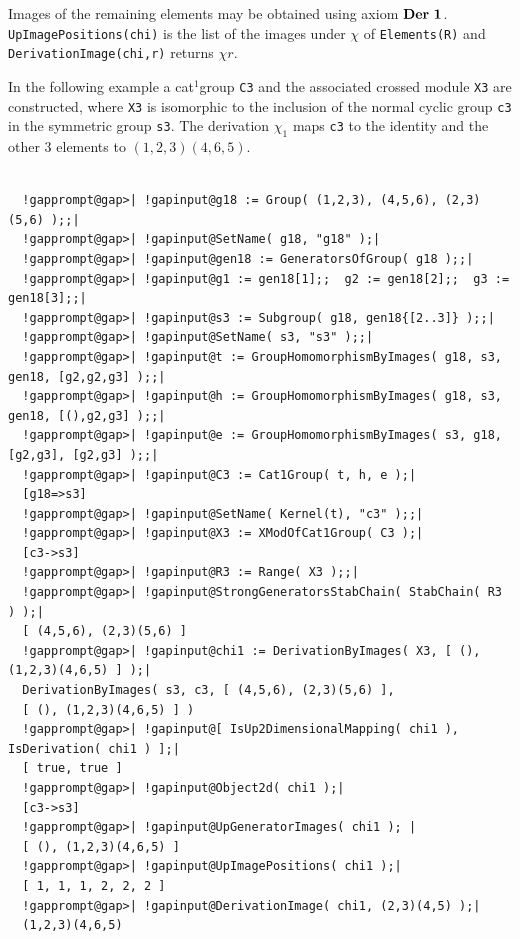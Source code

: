\documentclass[a4paper,11pt]{report}
\begin{document}
{{{ Images of the remaining elements may be obtained using axiom ${\bf Der\ 1}$. \texttt{UpImagePositions(chi)} is the list of the images under $\chi$ of \texttt{Elements(R)} and \texttt{DerivationImage(chi,r)} returns $\chi r$. 

 In the following example a cat$^1$\texttt{}group \texttt{C3} and the associated crossed module \texttt{X3} are constructed, where \texttt{X3} is isomorphic to the inclusion of the normal cyclic group \texttt{c3} in the symmetric group \texttt{s3}. The derivation $\chi_1$ maps \texttt{c3} to the identity and the other $3$ elements to $(1,2,3)(4,6,5)$. }

 

 
\begin{Verbatim}[commandchars=!@|,fontsize=\small,frame=single,label=Example]
  
  !gapprompt@gap>| !gapinput@g18 := Group( (1,2,3), (4,5,6), (2,3)(5,6) );;|
  !gapprompt@gap>| !gapinput@SetName( g18, "g18" );|
  !gapprompt@gap>| !gapinput@gen18 := GeneratorsOfGroup( g18 );;|
  !gapprompt@gap>| !gapinput@g1 := gen18[1];;  g2 := gen18[2];;  g3 := gen18[3];;|
  !gapprompt@gap>| !gapinput@s3 := Subgroup( g18, gen18{[2..3]} );;|
  !gapprompt@gap>| !gapinput@SetName( s3, "s3" );;|
  !gapprompt@gap>| !gapinput@t := GroupHomomorphismByImages( g18, s3, gen18, [g2,g2,g3] );;|
  !gapprompt@gap>| !gapinput@h := GroupHomomorphismByImages( g18, s3, gen18, [(),g2,g3] );;|
  !gapprompt@gap>| !gapinput@e := GroupHomomorphismByImages( s3, g18, [g2,g3], [g2,g3] );;|
  !gapprompt@gap>| !gapinput@C3 := Cat1Group( t, h, e );|
  [g18=>s3]
  !gapprompt@gap>| !gapinput@SetName( Kernel(t), "c3" );;|
  !gapprompt@gap>| !gapinput@X3 := XModOfCat1Group( C3 );|
  [c3->s3]
  !gapprompt@gap>| !gapinput@R3 := Range( X3 );;|
  !gapprompt@gap>| !gapinput@StrongGeneratorsStabChain( StabChain( R3 ) );|
  [ (4,5,6), (2,3)(5,6) ]
  !gapprompt@gap>| !gapinput@chi1 := DerivationByImages( X3, [ (), (1,2,3)(4,6,5) ] );|
  DerivationByImages( s3, c3, [ (4,5,6), (2,3)(5,6) ], 
  [ (), (1,2,3)(4,6,5) ] )
  !gapprompt@gap>| !gapinput@[ IsUp2DimensionalMapping( chi1 ), IsDerivation( chi1 ) ];|
  [ true, true ]
  !gapprompt@gap>| !gapinput@Object2d( chi1 );|
  [c3->s3]
  !gapprompt@gap>| !gapinput@UpGeneratorImages( chi1 ); |
  [ (), (1,2,3)(4,6,5) ]
  !gapprompt@gap>| !gapinput@UpImagePositions( chi1 );|
  [ 1, 1, 1, 2, 2, 2 ]
  !gapprompt@gap>| !gapinput@DerivationImage( chi1, (2,3)(4,5) );|
  (1,2,3)(4,6,5)
  
\end{Verbatim}
 

}}
\end{document}
